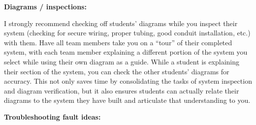 





\noindent
{\bf Diagrams / inspections:}

I strongly recommend checking off students' diagrams while you inspect their system (checking for secure wiring, proper tubing, good conduit installation, etc.) with them.  Have all team members take you on a ``tour'' of their completed system, with each team member explaining a different portion of the system you select while using their own diagram as a guide.  While a student is explaining their section of the system, you can check the other students' diagrams for accuracy.  This not only saves time by consolidating the tasks of system inspection and diagram verification, but it also ensures students can actually relate their diagrams to the system they have built and articulate that understanding to you.

\vskip 10pt

\goodbreak

\noindent
{\bf Troubleshooting fault ideas:}


